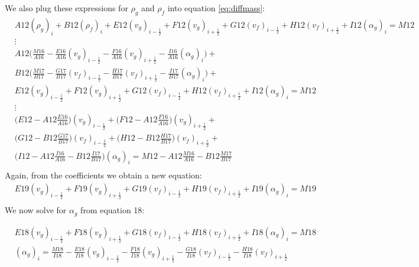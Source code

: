 \documentclass[11pt,letterpaper,titlepage]{article}
\newcommand{\half}{\frac{1}{2}}
\begin{document}
\newpage
We also plug these expressions for $\rho_g$ and $\rho_f$ into equation \ref{eq:diffmass}:
\begin{equation*}
\begin{aligned}
&A12(\rho_g)_i  + B12(\rho_f)_i  + E12   (v_g)_{i-\half}  + F12(v_g)_{i+\half} + G12   (v_f)_{i-\half} + H12 (v_f)_{i+\half} + I12(\alpha_g)_i   =M12  \\ 
&\vdots\\
&A12\biggr( \frac{M16}{A16} - \frac{E16}{A16}  (v_g)_{i-\half}  - \frac{F16}{A16}  (v_g)_{i+\half} - \frac{I16}{A16}(\alpha_g)_i \biggr)   + \\
&B12\biggr( \frac{M17}{B17} - \frac{G17}{B17}  (v_f)_{i-\half}  - \frac{H17}{B17}  (v_f)_{i+\half} - \frac{I17}{B17}(\alpha_g)_i \biggr)   + \\
&E12   (v_g)_{i-\half}  + F12(v_g)_{i+\half} + G12   (v_f)_{i-\half} + H12 (v_f)_{i+\half} + I12(\alpha_g)_i   =M12  \\ 
&\vdots\\
&\biggr( E12 - A12\frac{E16}{A16} \biggr)  (v_g)_{i-\half}  + \biggr( F12 - A12\frac{F16}{A16} \biggr)(v_g)_{i+\half} + \\
&\biggr( G12 - B12\frac{G17}{B17} \biggr)  (v_f)_{i-\half}  + \biggr( H12 - B12\frac{H17}{B17} \biggr)(v_f)_{i+\half} + \\
&\biggr( I12 - A12\frac{I16}{A16} - B12\frac{I17}{B17} \biggr)(\alpha_g)_i   =M12 - A12\frac{M16}{A16} - B12\frac{M17}{B17} \\ 
\end{aligned}
\end{equation*}
\newline
\noindent
Again, from the coefficients we obtain a new equation:
\begin{equation}
\begin{aligned}
&E19(v_g)_{i-\half} + F19(v_g)_{i+\half} + G19(v_f)_{i-\half} + H19(v_f)_{i+\half} + I19(\alpha_g)_i  = M19 \\ 
\end{aligned}
\end{equation}
\newline
\newline
\noindent
We now solve for $\alpha_g$ from equation 18:

\begin{equation*}
\begin{aligned}
&E18(v_g)_{i-\half} + F18(v_g)_{i+\half} + G18(v_f)_{i-\half} + H18(v_f)_{i+\half} + I18(\alpha_g)_i  = M18 \\ 
&(\alpha_g)_i  =\frac{M18}{I18} - \frac{E18}{I18}(v_g)_{i-\half} - \frac{F18}{I18}(v_g)_{i+\half} - \frac{G18}{I18}(v_f)_{i-\half} - \frac{H18}{I18}(v_f)_{i+\half}
\end{aligned}
\end{equation*}
\end{document}
